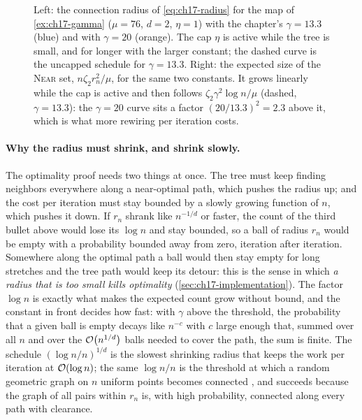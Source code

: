 \begin{figure}[tb]
  \centering
  \caption{Left: the connection radius of \cref{eq:ch17-radius} for the map
  of \cref{ex:ch17-gamma} ($\mu=76$, $d=2$, $\eta=1$) with the chapter's
  $\gamma=13.3$ (blue) and with $\gamma=20$ (orange). The cap $\eta$ is
  active while the tree is small, and for longer with the larger constant;
  the dashed curve is the uncapped schedule for $\gamma=13.3$. Right: the
  expected size of the \textsc{Near} set, $n\zeta_2r_n^2/\mu$, for the same
  two constants. It grows linearly while the cap is active and then
  follows $\zeta_2\gamma^2\log n/\mu$ (dashed, $\gamma=13.3$): the
  $\gamma=20$ curve sits a factor $(20/13.3)^2=2.3$ above it, which is what
  more rewiring per iteration costs.}
  \label{fig:ch17-radius}
\end{figure}

\paragraph{Why the radius must shrink, and shrink slowly.}
The optimality proof needs two things at once. The tree must keep finding
neighbors everywhere along a near-optimal path, which pushes the radius up;
and the cost per iteration must stay bounded by a slowly growing function of
$n$, which pushes it down. If $r_n$ shrank like $n^{-1/d}$ or faster, the count of the third bullet
above would lose its $\log n$ and stay bounded, so a ball of radius $r_n$
would be empty with a probability bounded away from zero, iteration after
iteration. Somewhere along the optimal path
a ball would then stay empty for long stretches and the tree path would keep
its detour: this is the sense in which \emph{a radius that is too small
kills optimality} (\cref{sec:ch17-implementation}). The factor $\log n$ is
exactly what makes the expected count grow without bound, and the constant
in front decides how fast: with $\gamma$ above the threshold, the
probability that a given ball is empty decays like $n^{-c}$ with $c$ large
enough that, summed over all $n$ and over the $\mathcal{O}\!\left(n^{1/d}\right)$ balls needed
to cover the path, the sum is finite. The schedule $(\log n/n)^{1/d}$ is the slowest shrinking radius that keeps
the work per iteration at $\mathcal{O}\!\left(\log n\right)$; the same $\log n/n$ is the
threshold at which a random geometric graph on $n$ uniform points becomes
connected \cite{penrose2003random}, and \rrtstar succeeds because the graph
of all pairs within $r_n$ is, with high probability, connected along every
path with clearance.

